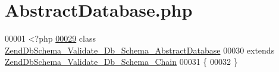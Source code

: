 \hypertarget{AbstractDatabase_8php}{\section{Abstract\-Database.\-php}
\label{AbstractDatabase_8php}
}

\begin{DoxyCode}
00001 <?php
\hypertarget{AbstractDatabase_8php_source_l00029}{}\hyperlink{classZendDbSchema__Validate__Db__Schema__AbstractDatabase}{00029} \textcolor{keyword}{class }\hyperlink{classZendDbSchema__Validate__Db__Schema__AbstractDatabase}{ZendDbSchema\_Validate\_Db\_Schema\_AbstractDatabase}
00030     \textcolor{keyword}{extends} \hyperlink{classZendDbSchema__Validate__Db__Schema__Chain}{ZendDbSchema\_Validate\_Db\_Schema\_Chain}
00031 \{
00032 \}
\end{DoxyCode}
